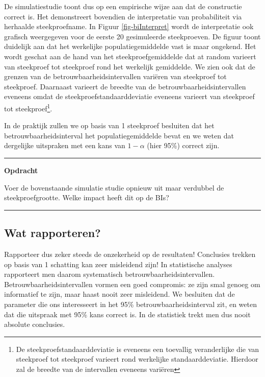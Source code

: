 \documentclass[
  dutch,
  letterpaper,
  12pt]{book}
\theoremstyle{definition}
\theoremstyle{definition}
\theoremstyle{definition}
\theoremstyle{remark}
\begin{document}
De simulatiestudie toont dus op een empirische wijze aan dat de
constructie correct is. Het demonstreert bovendien de interpretatie van
probabiliteit via herhaalde steekproefname. In Figuur
\ref{fig-biInterpret} wordt de interpretatie ook grafisch weergegeven
voor de eerste 20 gesimuleerde steekproeven. De figuur toont duidelijk
aan dat het werkelijke populatiegemiddelde vast is maar ongekend. Het
wordt geschat aan de hand van het steekproefgemiddelde dat at random
varieert van steekproef tot steekproef rond het werkelijk gemiddelde. We
zien ook dat de grenzen van de betrouwbaarheidsintervallen variëren van
steekproef tot steekproef. Daarnaast varieert de breedte van de
betrouwbaarheidsintervallen eveneens omdat de
steekproefstandaarddeviatie eveneens varieert van steekproef tot
steekproef\footnote{De steekproefstandaarddeviatie is eveneens een
  toevallig veranderlijke die van steekproef tot steekproef varieert
  rond werkelijke standaarddeviatie. Hierdoor zal de breedte van de
  intervallen eveneens variëren}.

In de praktijk zullen we op basis van 1 steekproef besluiten dat het
betrouwbaarheidsinterval het populatiegemiddelde bevat en we weten dat
dergelijke uitspraken met een kans van \(1-\alpha\) (hier 95\%) correct
zijn.

\begin{center}\rule{0.5\linewidth}{0.5pt}\end{center}

\textbf{Opdracht}

Voer de bovenstaande simulatie studie opnieuw uit maar verdubbel de
steekproefgrootte. Welke impact heeft dit op de BIs?

\begin{center}\rule{0.5\linewidth}{0.5pt}\end{center}

\subsection{Wat rapporteren?}\label{wat-rapporteren}

Rapporteer dus zeker steeds de onzekerheid op de resultaten! Conclusies
trekken op basis van 1 schatting kan zeer misleidend zijn! In
statistische analyses rapporteert men daarom systematisch
betrouwbaarheidsintervallen. Betrouwbaarheidsintervallen vormen een goed
compromis: ze zijn smal genoeg om informatief te zijn, maar haast nooit
zeer misleidend. We besluiten dat de parameter die ons interesseert in
het 95\% betrouwbaarheidsinterval zit, en weten dat die uitspraak met
95\% kans correct is. In de statistiek trekt men dus nooit absolute
conclusies.
\end{document}
